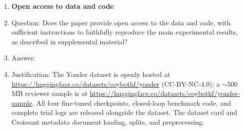 \begin{enumerate}
\item {\bf Open access to data and code}
    \item[] Question: Does the paper provide open access to the data and code, with sufficient instructions to faithfully reproduce the main experimental results, as described in supplemental material?
    \item[] Answer: \answerYes{}
    \item[] Justification: The Yonder dataset is openly hosted at \url{https://huggingface.co/datasets/coybothf/yonder} (CC-BY-NC-4.0); a $\sim$500\,MB reviewer sample is at \url{https://huggingface.co/datasets/coybothf/yonder-sample}. All four fine-tuned checkpoints, closed-loop benchmark code, and complete trial logs are released alongside the dataset. The dataset card and Croissant metadata document loading, splits, and preprocessing.


\end{enumerate}
